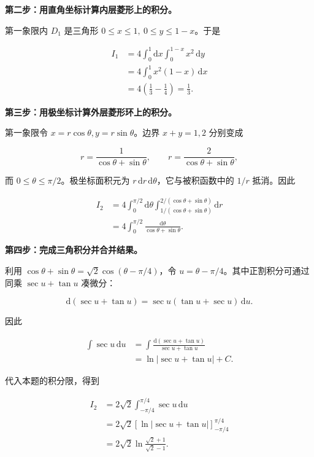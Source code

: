 \documentclass[UTF8,11pt,fontset=windows]{ctexart}
\begin{document}
\textbf{第二步：用直角坐标计算内层菱形上的积分。}

第一象限内 $D_1$ 是三角形 $0\le x\le1,\ 0\le y\le1-x$。于是

$$
\begin{aligned}
I_1
&=4\int_0^1\mathrm dx\int_0^{1-x}x^2\,\mathrm dy\\
&=4\int_0^1x^2(1-x)\,\mathrm dx\\
&=4\left(\frac13-\frac14\right)=\frac13.
\end{aligned}
$$

\textbf{第三步：用极坐标计算外层菱形环上的积分。}

第一象限令 $x=r\cos\theta,y=r\sin\theta$。边界 $x+y=1,2$ 分别变成

$$
r=\frac1{\cos\theta+\sin\theta},
\qquad
r=\frac2{\cos\theta+\sin\theta},
$$

而 $0\le\theta\le\pi/2$。极坐标面积元为 $r\,\mathrm dr\,\mathrm d\theta$，它与被积函数中的 $1/r$ 抵消。因此

$$
\begin{aligned}
I_2
&=4\int_0^{\pi/2}\mathrm d\theta
 \int_{1/(\cos\theta+\sin\theta)}^{2/(\cos\theta+\sin\theta)}\mathrm dr\\
&=4\int_0^{\pi/2}\frac{\mathrm d\theta}{\cos\theta+\sin\theta}.
\end{aligned}
$$

\textbf{第四步：完成三角积分并合并结果。}

利用 $\cos\theta+\sin\theta=\sqrt2\cos(\theta-\pi/4)$，令 $u=\theta-\pi/4$。其中正割积分可通过同乘 $\sec u+\tan u$ 凑微分：

$$
\mathrm d(\sec u+\tan u)
=\sec u(\tan u+\sec u)\,\mathrm du.
$$

因此

$$
\begin{aligned}
\int\sec u\,\mathrm du
&=\int\frac{\mathrm d(\sec u+\tan u)}{\sec u+\tan u}\\
&=\ln|\sec u+\tan u|+C.
\end{aligned}
$$

代入本题的积分限，得到

$$
\begin{aligned}
I_2
&=2\sqrt2\int_{-\pi/4}^{\pi/4}\sec u\,\mathrm du\\
&=2\sqrt2\left[\ln|\sec u+\tan u|\right]_{-\pi/4}^{\pi/4}\\
&=2\sqrt2\ln\frac{\sqrt2+1}{\sqrt2-1}.
\end{aligned}
$$
\end{document}
